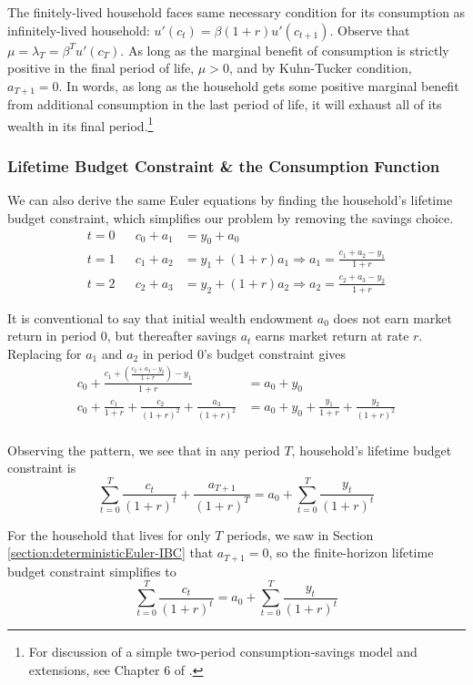 \documentclass[11pt]{article}
\begin{document}
The finitely-lived household faces same necessary condition for its consumption as infinitely-lived household: $u'(c_t) = \beta(1+r)u'(c_{t+1})$. Observe that $\mu = \lambda_T = \beta^T u'(c_T)$. As long as the marginal benefit of consumption is strictly positive in the final period of life, $\mu > 0$, and by Kuhn-Tucker condition, $a_{T+1} = 0$. In words, as long as the household gets some positive marginal benefit from additional consumption in the last period of life, it will exhaust all of its wealth in its final period.\footnote{For discussion of a simple two-period consumption-savings model and extensions, see Chapter 6 of \textcite{addacooper}.}

\subsubsection{Lifetime Budget Constraint \& the Consumption Function}
We can also derive the same Euler equations by finding the household's lifetime budget constraint, which simplifies our problem by removing the savings choice.
\begin{align*}
    t=0 && c_0 + a_1 &= y_0 + a_0 \\
    t=1 && c_1 + a_2 &= y_1 + (1+r)a_1 \Rightarrow a_1 = \frac{c_1 + a_2 - y_1}{1+r} \\
    t=2 && c_2 + a_3 &= y_2 + (1+r)a_2 \Rightarrow a_2 = \frac{c_2 + a_3 - y_2}{1+r}
\end{align*}

It is conventional to say that initial wealth endowment $a_0$ does not earn market return in period $0$, but thereafter savings $a_t$ earns market return at rate $r$. Replacing for $a_1$ and $a_2$ in period 0's budget constraint gives 
\begin{align*}
    c_0 + \frac{c_1 + \left(\frac{c_2 + a_3 - y_2}{1+r}\right) - y_1}{1+r} &= a_0 + y_0 \\ 
    c_0 + \frac{c_1}{1+r} + \frac{c_2}{(1+r)^2} + \frac{a_3}{(1+r)^2} &= a_0 + y_0 + \frac{y_1}{1+r} + \frac{y_2}{(1+r)^2} \\
\end{align*}

Observing the pattern, we see that in any period $T$, household's lifetime budget constraint is $$\sum_{t=0}^T \frac{c_t}{(1+r)^t} + \frac{a_{T+1}}{(1+r)^T} = a_0 + \sum_{t=0}^T \frac{y_t}{(1+r)^t}$$

For the household that lives for only $T$ periods, we saw in Section \ref{section:deterministicEuler-IBC} that $a_{T+1} = 0$, so the finite-horizon lifetime budget constraint simplifies to $$\sum_{t=0}^T \frac{c_t}{(1+r)^t} = a_0 + \sum_{t=0}^T \frac{y_t}{(1+r)^t}$$
\end{document}
